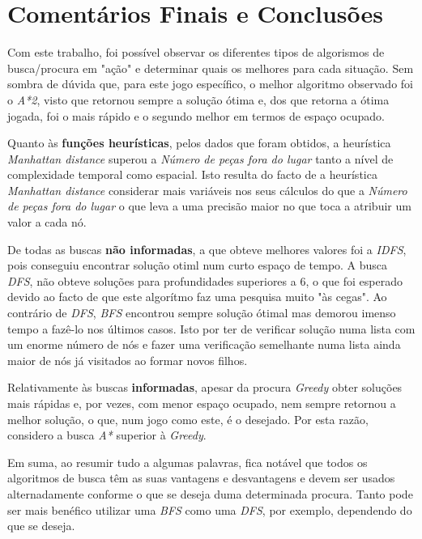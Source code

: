 \documentclass{article}
\begin{document}
\newpage
\section{Comentários Finais e Conclusões}
\hspace{10mm}Com este trabalho, foi possível observar os diferentes tipos de algorismos de busca/procura em "ação" e determinar quais os melhores para cada situação. Sem sombra de dúvida que, para este jogo específico, o melhor algoritmo observado foi o \textit{A*2}, visto que retornou sempre a solução ótima e, dos que retorna a ótima jogada, foi o mais rápido e o segundo melhor em termos de espaço ocupado.\par
Quanto às \textbf{funções heurísticas}, pelos dados que foram obtidos, a heurística \textit{Manhattan distance} superou a \textit{Número de peças fora do lugar} tanto a nível de complexidade temporal como espacial. Isto resulta do facto de a heurística \textit{Manhattan distance} considerar mais variáveis nos seus cálculos do que a \textit{Número de peças fora do lugar} o que leva a uma precisão maior no que toca a atribuir um valor a cada nó.\par
De todas as buscas \textbf{não informadas}, a que obteve melhores valores foi a \textit{IDFS}, pois conseguiu encontrar solução otiml num curto espaço de tempo. A busca \textit{DFS}, não obteve soluções para profundidades superiores a 6, o que foi esperado devido ao facto de que este algorítmo faz uma pesquisa muito "às cegas". Ao contrário de \textit{DFS}, \textit{BFS} encontrou sempre solução ótimal mas demorou imenso tempo a fazê-lo nos últimos casos. Isto por ter de verificar solução numa lista com um enorme número de nós e fazer uma verificação semelhante numa lista ainda maior de nós já visitados ao formar novos filhos.\par
Relativamente às buscas \textbf{informadas}, apesar da procura \textit{Greedy} obter soluções mais rápidas e, por vezes, com menor espaço ocupado, nem sempre retornou a melhor solução, o que, num jogo como este, é o desejado. Por esta razão, considero a busca \textit{A*} superior à \textit{Greedy}.\par
Em suma, ao resumir tudo a algumas palavras, fica notável que todos os algoritmos de busca têm as suas vantagens e desvantagens e devem ser usados alternadamente conforme o que se deseja duma determinada procura. Tanto pode ser mais benéfico utilizar uma \textit{BFS} como uma \textit{DFS}, por exemplo, dependendo do que se deseja.\\[5mm]
\end{document}
